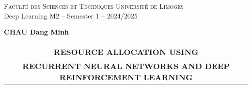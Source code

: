 \documentclass[11pt,a4paper]{article}
\begin{document}
\thispagestyle{empty}
\begin{center}

  \textsc{Facult\'e des Sciences et Techniques}  \hfill \textsc{Universit\'e de Limoges} \\
  Deep Learning \hfill M2 -- Semester 1 -- 2024/2025 \\
  \bigskip

  {\bf
    \vspace{0.9cm}
    \vspace{0.2cm}
    CHAU Dang Minh
  }
\end{center}
\bigskip

\vspace{7cm}

\renewcommand{\arraystretch}{2}
\begin{center}
  \begin{tabular}{c}
    \hline
    {\textbf{{\Large  RESOURCE ALLOCATION USING}}}                                 \\
    {\textbf{{\Large  RECURRENT NEURAL NETWORKS AND DEEP REINFORCEMENT LEARNING}}} \\
    \hline
  \end{tabular}
\end{center}

\vspace{0.5cm}
\pagestyle{plain}

\printbibliography
\end{document}

